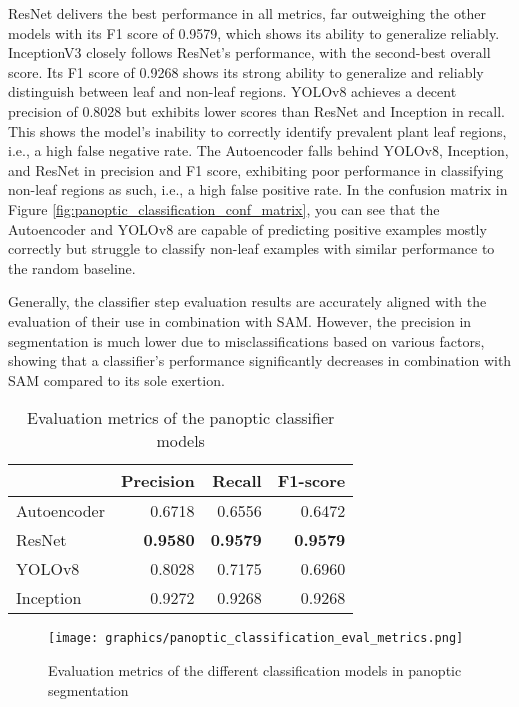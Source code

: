 \documentclass[draft,final]{vutinfth} %
\begin{document}
ResNet delivers the best performance in all metrics, far outweighing the other models with its F1 score of 0.9579, which shows its ability to generalize reliably.
InceptionV3 closely follows ResNet's performance, with the second-best overall score. Its F1 score of 0.9268 shows its strong ability to generalize and reliably distinguish between leaf and non-leaf regions.
YOLOv8 achieves a decent precision of 0.8028 but exhibits lower scores than ResNet and Inception in recall. This shows the model's inability to correctly identify prevalent plant leaf regions, i.e., a high false negative rate. The Autoencoder falls behind YOLOv8, Inception, and ResNet in precision and F1 score, exhibiting poor performance in classifying non-leaf regions as such, i.e., a high false positive rate. In the confusion matrix in Figure \ref{fig:panoptic_classification_conf_matrix}, you can see that the Autoencoder and YOLOv8 are capable of predicting positive examples mostly correctly but struggle to classify non-leaf examples with similar performance to the random baseline.

Generally, the classifier step evaluation results are accurately aligned with the evaluation of their use in combination with SAM. However, the precision in segmentation is much lower due to misclassifications based on various factors, showing that a classifier's performance significantly decreases in combination with SAM compared to its sole exertion.

\begin{table}[]
    \centering
    \begin{tabular}{lrrr}
    \toprule
    & Precision & Recall & F1-score \\
    \midrule
    Autoencoder & 0.6718 & 0.6556 & 0.6472 \\
    ResNet & \textbf{0.9580} & \textbf{0.9579} & \textbf{0.9579} \\
    YOLOv8 & 0.8028 & 0.7175 & 0.6960 \\
    Inception & 0.9272 & 0.9268 & 0.9268 \\
    \bottomrule
    \end{tabular}
    \caption{Evaluation metrics of the panoptic classifier models}
    \label{tab:panoptic_classification_metrics}
\end{table}

\begin{figure}
    \centering
    \texttt{[image: graphics/panoptic\_classification\_eval\_metrics.png]}
    \caption{Evaluation metrics of the different classification models in panoptic segmentation}
    \label{fig:panoptic_classification_eval_metrics}
\end{figure}
\end{document}
